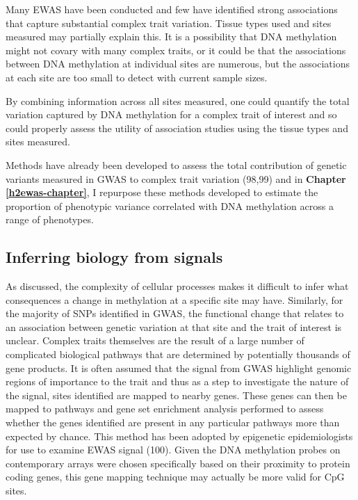 \documentclass[11pt,oneside]{bristolthesis}
\begin{document}
Many EWAS have been conducted and few have identified strong associations that capture substantial complex trait variation. Tissue types used and sites measured may partially explain this. It is a possibility that DNA methylation might not covary with many complex traits, or it could be that the associations between DNA methylation at individual sites are numerous, but the associations at each site are too small to detect with current sample sizes.

By combining information across all sites measured, one could quantify the total variation captured by DNA methylation for a complex trait of interest and so could properly assess the utility of association studies using the tissue types and sites measured.

Methods have already been developed to assess the total contribution of genetic variants measured in GWAS to complex trait variation (98,99) and in \textbf{Chapter \ref{h2ewas-chapter}}, I repurpose these methods developed to estimate the proportion of phenotypic variance correlated with DNA methylation across a range of phenotypes.

\hypertarget{inferring-biology-from-signals}{%
\subsection{Inferring biology from signals}\label{inferring-biology-from-signals}}

As discussed, the complexity of cellular processes makes it difficult to infer what consequences a change in methylation at a specific site may have. Similarly, for the majority of SNPs identified in GWAS, the functional change that relates to an association between genetic variation at that site and the trait of interest is unclear. Complex traits themselves are the result of a large number of complicated biological pathways that are determined by potentially thousands of gene products. It is often assumed that the signal from GWAS highlight genomic regions of importance to the trait and thus as a step to investigate the nature of the signal, sites identified are mapped to nearby genes. These genes can then be mapped to pathways and gene set enrichment analysis performed to assess whether the genes identified are present in any particular pathways more than expected by chance. This method has been adopted by epigenetic epidemiologists for use to examine EWAS signal (100). Given the DNA methylation probes on contemporary arrays were chosen specifically based on their proximity to protein coding genes, this gene mapping technique may actually be more valid for CpG sites.
\end{document}
